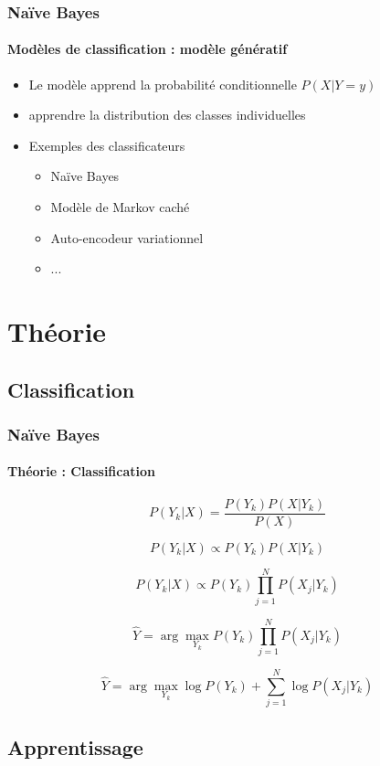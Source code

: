 \documentclass[xcolor=table]{beamer}
\begin{document}
\begin{frame}
	\frametitle{Naïve Bayes}
	\framesubtitle{Modèles de classification : modèle génératif}
	
	\begin{itemize}
		\item Le modèle apprend la probabilité conditionnelle $P(X|Y=y)$
		\item apprendre la distribution des classes individuelles
		\item Exemples des classificateurs 
		\begin{itemize}
			\item Naïve Bayes
			\item Modèle de Markov caché
			\item Auto-encodeur variationnel
			\item ...
		\end{itemize}
	\end{itemize}
	
\end{frame}

\section{Théorie}

\subsection{Classification}

\begin{frame}
	\frametitle{Naïve Bayes}
	\framesubtitle{Théorie : Classification}
	
	\[P(Y_k|X) = \frac{P(Y_k) P(X|Y_k)}{P(X)}\]
	
	\[P(Y_k|X) \propto P(Y_k) P(X|Y_k)\]
	
	\[P(Y_k|X) \propto P(Y_k) \prod_{j=1}^{N} P(X_j|Y_k)\]
	
	\[\hat{Y} = \arg\max_{Y_k} P(Y_k) \prod_{j=1}^{N} P(X_j|Y_k)\]
	
	\[\hat{Y} = \arg\max_{Y_k} \log P(Y_k) + \sum_{j=1}^{N} \log P(X_j|Y_k)\]
	
\end{frame}

\subsection{Apprentissage}
\end{document}
